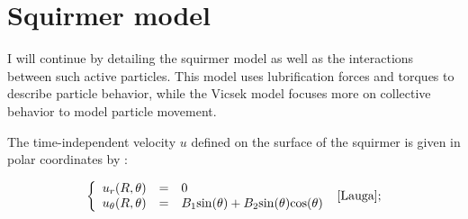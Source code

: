 \documentclass{article}
\begin{document}
\newpage
\section{Squirmer model}
I will continue by detailing the squirmer model as well as the interactions 
between such active particles. This model uses lubrification forces 
and torques to describe particle behavior, while the Vicsek model focuses more
on collective behavior to model particle movement.

\begin{center}
    \end{center}
The time-independent velocity $u$ defined on the surface of the squirmer is given 
in polar coordinates by :

\begin{align*}
   \left\{\begin{array}{rcl}
      u_r(R,\theta) &=& 0 \\
      u_\theta(R,\theta) &=& B_1\mathrm{sin}(\theta)+B_2\mathrm{sin}(\theta)\mathrm{cos}(\theta)
   \end{array}\right.\ \cite{Lauga};
\end{align*}
\end{document}
